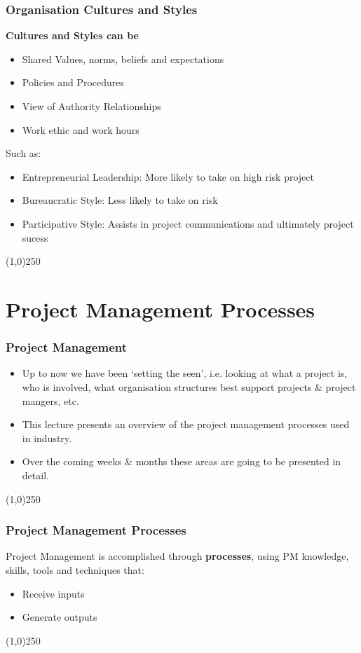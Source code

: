 \begin{frame}
\frametitle{Organisation Cultures and Styles}
\textbf{Cultures and Styles can be}\\
		\begin{itemize}
			\item Shared Values, norms, beliefs and expectations
			\item Policies and Procedures
			\item View of Authority Relationships
			\item Work ethic and work hours
		\end{itemize}
Such as:\\
\begin{itemize}
	\item Entrepreneurial Leadership: More likely to take on high risk project
	\item Bureaucratic Style: Less likely to take on risk
	\item Participative Style: Assists in project communications and ultimately project sucess
\end{itemize}
\end{frame}
\begin{center}\line(1,0){250}\end{center}


\section{Project Management Processes}


\begin{frame}
\frametitle{Project Management}
\begin{itemize}
	\item Up to now we have been `setting the seen', i.e. looking at what a project is, who is involved, what organisation structures best support projects \& project mangers, etc.
	\item This lecture presents an overview of the project management processes used in industry.  
	\item Over the coming weeks \& months these areas are going to be presented in detail.
\end{itemize}
\end{frame}
\begin{center}\line(1,0){250}\end{center}



\begin{frame}
\frametitle{Project Management Processes}
Project Management is accomplished through \textbf{processes}, using PM knowledge, skills, tools and techniques that:\\
\begin{itemize}
	\item Receive inputs
	\item Generate outputs
\end{itemize}
\end{frame}
\begin{center}\line(1,0){250}\end{center}




